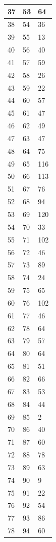 \begin{tabular}{p{}p{}p{}}
\hline
37 & 53 & 64 \\
\hline
38 & 54 & 36 \\
\hline
39 & 55 & 13 \\
\hline
40 & 56 & 40 \\
\hline
41 & 57 & 59 \\
\hline
42 & 58 & 26 \\
\hline
43 & 59 & 22 \\
\hline
44 & 60 & 57 \\
\hline
45 & 61 & 47 \\
\hline
46 & 62 & 49 \\
\hline
47 & 63 & 47 \\
\hline
48 & 64 & 75 \\
\hline
49 & 65 & 116 \\
\hline
50 & 66 & 113 \\
\hline
51 & 67 & 76 \\
\hline
52 & 68 & 94 \\
\hline
53 & 69 & 120 \\
\hline
54 & 70 & 33 \\
\hline
55 & 71 & 102 \\
\hline
56 & 72 & 46 \\
\hline
57 & 73 & 89 \\
\hline
58 & 74 & 24 \\
\hline
59 & 75 & 65 \\
\hline
60 & 76 & 102 \\
\hline
61 & 77 & 46 \\
\hline
62 & 78 & 64 \\
\hline
63 & 79 & 57 \\
\hline
64 & 80 & 64 \\
\hline
65 & 81 & 51 \\
\hline
66 & 82 & 66 \\
\hline
67 & 83 & 53 \\
\hline
68 & 84 & 44 \\
\hline
69 & 85 & 2 \\
\hline
70 & 86 & 40 \\
\hline
71 & 87 & 60 \\
\hline
72 & 88 & 78 \\
\hline
73 & 89 & 63 \\
\hline
74 & 90 & 9 \\
\hline
75 & 91 & 22 \\
\hline
76 & 92 & 54 \\
\hline
77 & 93 & 86 \\
\hline
78 & 94 & 60 \\

\end{tabular}
